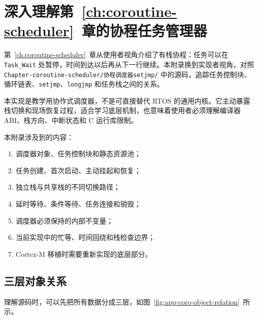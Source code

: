 \chapter{深入理解第~\ref{ch:coroutine-scheduler}~章的协程任务管理器} \label{app:coroutine-internals}

第~\ref{ch:coroutine-scheduler}~章从使用者视角介绍了有栈协程：任务可以在 \texttt{Task\_Wait} 处暂停，时间到达以后再从下一行继续。本附录换到实现者视角，对照 \texttt{Chapter-coroutine-scheduler/协程调度器setjmp/} 中的源码，追踪任务控制块、循环链表、\texttt{setjmp}、\texttt{longjmp} 和任务栈之间的关系。

本实现是教学用协作式调度器，不是可直接替代 RTOS 的通用内核。它主动暴露栈切换和现场恢复过程，适合学习底层机制，也意味着使用者必须理解编译器 ABI、栈方向、中断状态和 C 运行库限制。

\medskip 本附录涉及到的内容：
\begin{enumerate}
\item 调度器对象、任务控制块和静态资源池；
\item 任务创建、首次启动、主动挂起和恢复；
\item 独立栈与共享栈的不同切换路径；
\item 延时等待、条件等待、任务连接和销毁；
\item 调度器必须保持的内部不变量；
\item 当前实现中的忙等、时间回绕和栈检查边界；
\item Cortex-M 移植时需要重新实现的底层部分。
\end{enumerate}

\section{三层对象关系}

理解源码时，可以先把所有数据分成三层，如图~\ref{fig:app-coro-object-relation}~所示。

